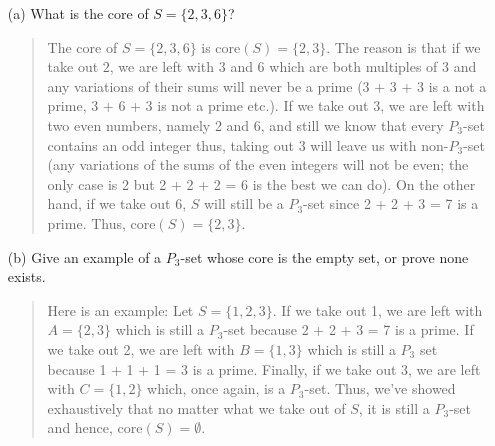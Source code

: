 \documentclass[12pt, a4paper]{article}                      %
\begin{document}
\begin{itemize}
\begin{itemize}
\item[(a)]
What is the core of $S = \{2, 3, 6\}$?
\begin{quote}
The core of $S = \{2, 3, 6\}$ is core$(S) = \{2, 3\}$.
The reason is that if we take out $2$, we are left with 3 and 6 which are both multiples of 3 and any variations of their sums will never be a prime (3 + 3 + 3 is a not a prime, 3 + 6 + 3 is not a prime etc.).
If we take out 3, we are left with two even numbers, namely 2 and 6, and still we know that every $P_3$-set contains an odd integer thus, taking out 3 will leave us with non-$P_3$-set (any variations of the sums of the even integers will not be even; the only case is 2 but 2 + 2 + 2 = 6 is the best we can do). On the other hand, if we take out 6, $S$ will still be a $P_3$-set since 2 + 2 + 3 = 7 is a prime.
Thus, core$(S) = \{2, 3\}$.
\end{quote}

\item[]

\item[(b)]
Give an example of a $P_3$-set whose core is the empty set, or prove none exists.
\begin{quote}
Here is an example: Let $S = \{1, 2, 3\}$. If we take out 1, we are left with $A = \{2, 3\}$
which is still a $P_3$-set because 2 + 2 + 3 = 7 is a prime. If we take out 2, we are left with
$B = \{1, 3\}$ which is still a $P_3$ set because 1 + 1 + 1 = 3 is a prime. Finally, if we take out
3, we are left with $C = \{1, 2\}$ which, once again, is a $P_3$-set. Thus, we've showed exhaustively
that no matter what we take out of $S$, it is still a $P_3$-set and hence, core$(S) = \emptyset$.
\end{quote}

\item[]


\end{itemize}
\end{itemize}
\end{document}
